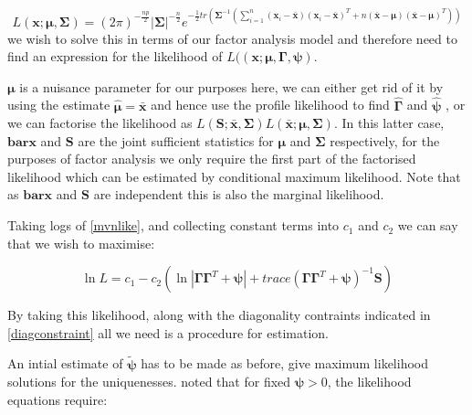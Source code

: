 \begin{equation}
\label{mvnlike}
L(\boldsymbol{x}; \boldsymbol{\mu}, \boldsymbol{\Sigma}) = (2 \pi)^{-\frac{np}{2}} |\boldsymbol{\Sigma}|^{-\frac{n}{2}} e^{-\frac{1}{2}tr\left( \boldsymbol{\Sigma}^{-1} ( \sum_{i=1}^{n}(\boldsymbol{x}_{i} - \boldsymbol{\bar{x}})(\boldsymbol{x}_{i} - \boldsymbol{\bar{x}})^{T} + n(\boldsymbol{\bar{x}} - \boldsymbol{\mu})(\boldsymbol{\bar{x}} - \boldsymbol{\mu})^{T} ) \right)}
\end{equation}
we wish to solve this in terms of our factor analysis model and therefore need to find an expression for the likelihood of $L((\boldsymbol{x}; \boldsymbol{\mu}, \boldsymbol{\Gamma}, \boldsymbol{\psi})$.   

$\boldsymbol{\mu}$ is a nuisance parameter for our purposes here, we can either get rid of it by using the estimate $\boldsymbol{\hat{\mu}} = \boldsymbol{\bar{x}}$ and hence use the profile likelihood to find $\boldsymbol{\hat{\Gamma}}$ and  $\boldsymbol{\hat{\psi}}$ , or we can factorise the likelihood as  $L(\boldsymbol{S}; \boldsymbol{\bar{x}}, \boldsymbol{\Sigma}) L(\boldsymbol{\bar{x}}; \boldsymbol{\mu}, \boldsymbol{\Sigma})$.   In this latter case, $\boldsymbol{bar{x}}$ and $\boldsymbol{S}$ are the joint sufficient statistics for $\boldsymbol{\mu}$ and $\boldsymbol{\Sigma}$ respectively, for the purposes of factor analysis we only require the first part of the factorised likelihood which can be estimated by conditional maximum likelihood.   Note that as $\boldsymbol{bar{x}}$ and $\boldsymbol{S}$ are independent this is also the marginal likelihood.

Taking logs of \ref{mvnlike}, and collecting constant terms into $c_{1}$ and $c_{2}$ we can say that we wish to maximise:

\begin{equation}
\label{fall}
\ln L = c_{1} - c_{2} \left( \ln |\boldsymbol{\Gamma} \boldsymbol{\Gamma}^{T} + \boldsymbol{\psi}| + trace(\boldsymbol{\Gamma} \boldsymbol{\Gamma}^{T} + \boldsymbol{\psi})^{-1}\boldsymbol{S} \right)
\end{equation}

By taking this likelihood, along with the diagonality contraints indicated in \ref{diagconstraint} all we need is a procedure for estimation.   

An intial estimate of $\widetilde{\boldsymbol{\psi}}$ has to be made as before, \cite{Lawley+Maxwell:1971} give maximum likelihood solutions for the uniquenesses.  \cite{Joreskog:1967}  noted that for fixed $\boldsymbol{\psi}>0$, the likelihood equations require:

